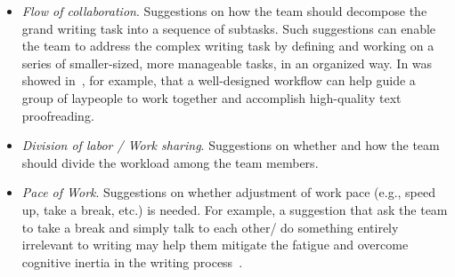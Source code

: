\begin{itemize}
	\item {\em Flow of collaboration}. Suggestions on how the team should decompose the grand writing task into a sequence of subtasks. Such suggestions can enable the team to address the complex writing task by defining and working on a series of smaller-sized, more manageable tasks, in an organized way. In was showed in~\cite{bernstein2010soylent}, for example, that a well-designed workflow can help guide a group of laypeople to work together and accomplish high-quality text proofreading. 
	\item {\em Division of labor / Work sharing}. Suggestions on whether and how the team should divide the workload among the team members. 
	\item {\em Pace of Work}. Suggestions on whether adjustment of work pace (e.g., speed up, take a break, etc.) is needed. For example, a suggestion that ask the team to take a break and simply talk to each other/ do something entirely irrelevant to writing may help them mitigate the fatigue and overcome cognitive inertia in the writing process~\citep{dai2015and}.
\end{itemize}


